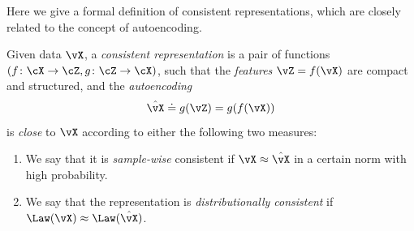 \documentclass[../../book-main.tex]{subfiles}
\begin{document}
Here we give a formal definition of consistent representations, which
are closely related to the concept of autoencoding. %
\begin{definition}\label{def:bidirectional_rep}
  Given data \(\vX\), a \textit{consistent representation} is a pair
  of functions \((f \colon \cX \to \cZ, g \colon \cZ \to \cX)\), such
  that the \textit{features} \(\vZ = f(\vX)\) are compact and
  structured, and the \textit{autoencoding} 
  \begin{equation}
    \hat{\vX} \doteq g(\vZ) = g(f(\vX))
  \end{equation}
  is \textit{close} to \(\vX\) according to either the
  following two measures:
  \begin{enumerate}
    \item We say that it is \textit{sample-wise} consistent if \(\vX
      \approx \hat{\vX}\) in a certain norm with high probability.
    \item We say that the representation is \textit{distributionally
      consistent} if \(\Law(\vX) \approx \Law(\hat{\vX})\).
  \end{enumerate}
\end{definition}
\end{document}
